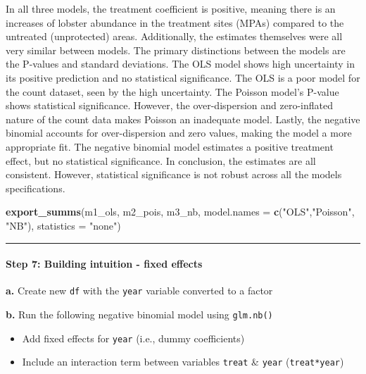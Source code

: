 \documentclass[
]{article}
\newenvironment{Shaded}{\begin{snugshade}}{\end{snugshade}}
\newcommand{\AttributeTok}[1]{\textcolor[rgb]{0.13,0.29,0.53}{#1}}
\newcommand{\FunctionTok}[1]{\textcolor[rgb]{0.13,0.29,0.53}{\textbf{#1}}}
\newcommand{\NormalTok}[1]{#1}
\newcommand{\StringTok}[1]{\textcolor[rgb]{0.31,0.60,0.02}{#1}}
\providecommand{\tightlist}{%
  \setlength{\itemsep}{0pt}\setlength{\parskip}{0pt}}
\begin{document}
In all three models, the treatment coefficient is positive, meaning
there is an increases of lobster abundance in the treatment sites (MPAs)
compared to the untreated (unprotected) areas. Additionally, the
estimates themselves were all very similar between models. The primary
distinctions between the models are the P-values and standard
deviations. The OLS model shows high uncertainty in its positive
prediction and no statistical significance. The OLS is a poor model for
the count dataset, seen by the high uncertainty. The Poisson model's
P-value shows statistical significance. However, the over-dispersion and
zero-inflated nature of the count data makes Poisson an inadequate
model. Lastly, the negative binomial accounts for over-dispersion and
zero values, making the model a more appropriate fit. The negative
binomial model estimates a positive treatment effect, but no statistical
significance. In conclusion, the estimates are all consistent. However,
statistical significance is not robust across all the models
specifications.

\begin{Shaded}
\begin{Highlighting}[]
\FunctionTok{export\_summs}\NormalTok{(m1\_ols, m2\_pois, m3\_nb,}
             \AttributeTok{model.names =} \FunctionTok{c}\NormalTok{(}\StringTok{"OLS"}\NormalTok{,}\StringTok{"Poisson"}\NormalTok{, }\StringTok{"NB"}\NormalTok{),}
             \AttributeTok{statistics =} \StringTok{"none"}\NormalTok{)}
\end{Highlighting}
\end{Shaded}

\begin{center}\rule{0.5\linewidth}{0.5pt}\end{center}

\paragraph{Step 7: Building intuition - fixed
effects}\label{step-7-building-intuition---fixed-effects}

\textbf{a.} Create new \texttt{df} with the \texttt{year} variable
converted to a factor

\textbf{b.} Run the following negative binomial model using
\texttt{glm.nb()}

\begin{itemize}
\tightlist
\item
  Add fixed effects for \texttt{year} (i.e., dummy coefficients)
\item
  Include an interaction term between variables \texttt{treat} \&
  \texttt{year} (\texttt{treat*year})
\end{itemize}
\end{document}
